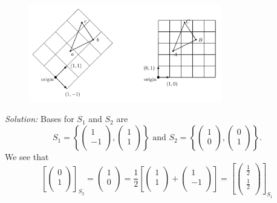 \documentclass{article}
\begin{document}
\begin{figure}[h!]
\centering
\includegraphics[width=0.75\textwidth]{Vector.png}
\end{figure}
\newblock
\newline\textit{Solution:} Bases for $S_1$ and $S_2$ are \[{{S}_{1}}=\left\{ \left( \begin{matrix}
  1 \\ 
  -1 \\ 
\end{matrix} \right),\left( \begin{matrix}
  1 \\ 
  1 \\ 
\end{matrix} \right) \right\}\text{ and }{{S}_{2}}=\left\{ \left( \begin{matrix}
  1 \\ 
  0 \\ 
\end{matrix} \right),\left( \begin{matrix}
  0 \\ 
  1 \\ 
\end{matrix} \right) \right\}.\] We see that \[{{\left[ \left( \begin{matrix}
  0 \\ 
  1 \\ 
\end{matrix} \right) \right]}_{{{S}_{2}}}}=\left( \begin{matrix}
  1 \\ 
  0 \\ 
\end{matrix} \right)=\frac{1}{2}\left[ \left( \begin{matrix}
  1 \\ 
  1 \\ 
\end{matrix} \right)+\left( \begin{matrix}
  1 \\ 
  -1 \\ 
\end{matrix} \right) \right]={{\left[ \left( \begin{matrix}
  \frac{1}{2} \\ 
  \frac{1}{2} \\ 
\end{matrix} \right) \right]}_{{{S}_{1}}}}\]
\end{document}
